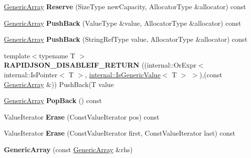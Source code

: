 \begin{DoxyCompactItemize}
\item 
\hyperlink{class_generic_array}{Generic\+Array} {\bfseries Reserve} (Size\+Type new\+Capacity, Allocator\+Type \&allocator) const \hypertarget{class_generic_array_affe36316cbe3f80ece8a6fc45b777a58}{}\label{class_generic_array_affe36316cbe3f80ece8a6fc45b777a58}

\item 
\hyperlink{class_generic_array}{Generic\+Array} {\bfseries Push\+Back} (Value\+Type \&value, Allocator\+Type \&allocator) const \hypertarget{class_generic_array_a6aad4336bb87edc9113f34a6d9073d53}{}\label{class_generic_array_a6aad4336bb87edc9113f34a6d9073d53}

\item 
\hyperlink{class_generic_array}{Generic\+Array} {\bfseries Push\+Back} (String\+Ref\+Type value, Allocator\+Type \&allocator) const \hypertarget{class_generic_array_af583610a94a0fe360a5cbfd34fe8aa6c}{}\label{class_generic_array_af583610a94a0fe360a5cbfd34fe8aa6c}

\item 
{\footnotesize template$<$typename T $>$ }\\{\bfseries R\+A\+P\+I\+D\+J\+S\+O\+N\+\_\+\+D\+I\+S\+A\+B\+L\+E\+I\+F\+\_\+\+R\+E\+T\+U\+RN} ((internal\+::\+Or\+Expr$<$ internal\+::\+Is\+Pointer$<$ T $>$, \hyperlink{structinternal_1_1_is_generic_value}{internal\+::\+Is\+Generic\+Value}$<$ T $>$ $>$),(const \hyperlink{class_generic_array}{Generic\+Array} \&)) Push\+Back(T value\hypertarget{class_generic_array_a12adff0c1e11aa3be6f4160015a65df0}{}\label{class_generic_array_a12adff0c1e11aa3be6f4160015a65df0}

\item 
\hyperlink{class_generic_array}{Generic\+Array} {\bfseries Pop\+Back} () const \hypertarget{class_generic_array_a87a5a9acf7b26a81df42a54553bdbec4}{}\label{class_generic_array_a87a5a9acf7b26a81df42a54553bdbec4}

\item 
Value\+Iterator {\bfseries Erase} (Const\+Value\+Iterator pos) const \hypertarget{class_generic_array_a1d71be1384a0184514d9921d77b6a060}{}\label{class_generic_array_a1d71be1384a0184514d9921d77b6a060}

\item 
Value\+Iterator {\bfseries Erase} (Const\+Value\+Iterator first, Const\+Value\+Iterator last) const \hypertarget{class_generic_array_a105cb20275127cbd73fbc24e6af41dd1}{}\label{class_generic_array_a105cb20275127cbd73fbc24e6af41dd1}

\item 
{\bfseries Generic\+Array} (const \hyperlink{class_generic_array}{Generic\+Array} \&rhs)\hypertarget{class_generic_array_aa589d897a194b349d5053391a6f1491d}{}\label{class_generic_array_aa589d897a194b349d5053391a6f1491d}


\end{DoxyCompactItemize}
